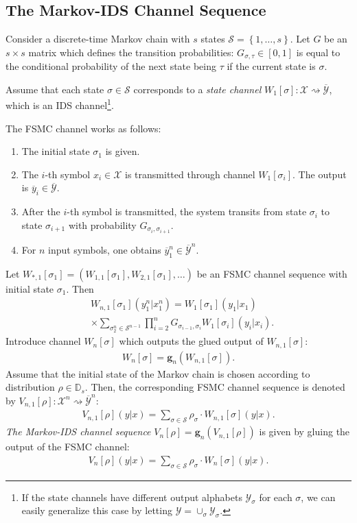 \documentclass[journal, twocol]{IEEEtran}
\newcommand{\oy}{{\overline{y}}}
\newcommand{\bD}{{\mathbb{D}}}
\newcommand{\mS}{{\mathcal{S}}}
\newcommand{\mX}{{\mathcal{X}}}
\newcommand{\mY}{{\mathcal{Y}}}
\newcommand{\omY}{{\overline{\mathcal{Y}}}}
\newcommand{\set}[1]{{\left\{{#1}\right\}}}
\newcommand{\tosq}{\rightsquigarrow}
\newcommand{\bg}{\mathbf{g}}
\begin{document}
\subsection{The Markov-IDS Channel Sequence}

Consider a discrete-time Markov chain with $s$ states $\mS=\set{1,\dots,s}$. 
Let $G$ be an $s\times s$ matrix which defines the transition probabilities: $G_{\sigma, \tau}\in[0,1]$ is equal to the conditional probability of the next state being $\tau$ if the current state is $\sigma$.

Assume that each state $\sigma\in\mS$ corresponds to a \emph{state channel} $W_1[\sigma]:\mX\tosq\omY$, which is an IDS channel\footnote{If the state channels have different output alphabets $\mY_\sigma$ for each $\sigma$, we can easily generalize this case by letting $\mY=\cup_\sigma \mY_\sigma$.}.

The FSMC channel \cite{gallager68information} works as follows:
\begin{enumerate}
	\item The initial state $\sigma_1$ is given.
	\item The $i$-th symbol $x_i\in\mX$ is transmitted through channel $W_1[\sigma_i]$. 
	The output is $\oy_i\in\omY$.
	\item After the $i$-th symbol is transmitted, the system transits from state $\sigma_i$ to state $\sigma_{i+1}$ with probability $G_{\sigma_i,\sigma_{i+1}}$.	
	\item For $n$ input symbols, one obtains $\oy_1^n\in\omY^n$. 	
\end{enumerate}

Let $W_{*,1}[\sigma_1]=(W_{1,1}[\sigma_1],W_{2,1}[\sigma_1],\dots)$ be an FSMC channel sequence with initial state $\sigma_1$.
Then
\begin{align}
&W_{n,1}[\sigma_1](y_1^n|x_1^n)=
W_1[\sigma_1](y_1|x_1)
\nonumber\\&\times
\sum_{\sigma_2^n\in\mS^{n-1}} \prod_{i=2}^n G_{\sigma_{i-1},\sigma_i}W_1[\sigma_i](y_i|x_i).
\label{eq:Wn1}
\end{align}
Introduce channel $W_n[\sigma]$ which outputs the glued output of $W_{n,1}[\sigma]$:
\begin{align}
W_n[\sigma]=\bg_n(W_{n,1}[\sigma]).
\label{eq:Wn}
\end{align}
Assume that the initial state of the Markov chain is chosen according to distribution $\rho \in\bD_s$.
Then, the corresponding FSMC channel sequence is denoted by $V_{n,1}[\rho]: \mX^n\tosq\omY^n$:
\begin{align}
V_{n,1}[\rho](y|x)=\sum_{\sigma\in\mS}\rho_\sigma \cdot W_{n,1}[\sigma](y|x).
\label{eq:Vn1}
\end{align}
\emph{The Markov-IDS channel sequence} $V_n[\rho]=\bg_n(V_{n,1}[\rho])$ is given by gluing the output of the FSMC channel:
\begin{align}
V_n[\rho](y|x)=\sum_{\sigma\in\mS}\rho_\sigma \cdot W_n[\sigma](y|x). 
\label{eq:Vn}
\end{align}
\end{document}
